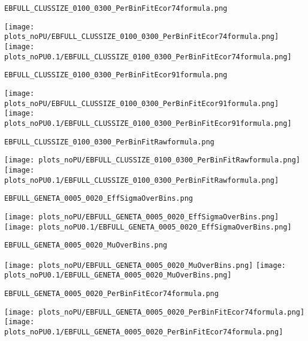 \begin{frame}[fragile]
\begin{verbatim}
EBFULL_CLUSSIZE_0100_0300_PerBinFitEcor74formula.png
\end{verbatim}
\texttt{[image: plots\_noPU/EBFULL\_CLUSSIZE\_0100\_0300\_PerBinFitEcor74formula.png]}
\texttt{[image: plots\_noPU0.1/EBFULL\_CLUSSIZE\_0100\_0300\_PerBinFitEcor74formula.png]}
\end{frame}
\begin{frame}[fragile]
\begin{verbatim}
EBFULL_CLUSSIZE_0100_0300_PerBinFitEcor91formula.png
\end{verbatim}
\texttt{[image: plots\_noPU/EBFULL\_CLUSSIZE\_0100\_0300\_PerBinFitEcor91formula.png]}
\texttt{[image: plots\_noPU0.1/EBFULL\_CLUSSIZE\_0100\_0300\_PerBinFitEcor91formula.png]}
\end{frame}
\begin{frame}[fragile]
\begin{verbatim}
EBFULL_CLUSSIZE_0100_0300_PerBinFitRawformula.png
\end{verbatim}
\texttt{[image: plots\_noPU/EBFULL\_CLUSSIZE\_0100\_0300\_PerBinFitRawformula.png]}
\texttt{[image: plots\_noPU0.1/EBFULL\_CLUSSIZE\_0100\_0300\_PerBinFitRawformula.png]}
\end{frame}
\begin{frame}[fragile]
\begin{verbatim}
EBFULL_GENETA_0005_0020_EffSigmaOverBins.png
\end{verbatim}
\texttt{[image: plots\_noPU/EBFULL\_GENETA\_0005\_0020\_EffSigmaOverBins.png]}
\texttt{[image: plots\_noPU0.1/EBFULL\_GENETA\_0005\_0020\_EffSigmaOverBins.png]}
\end{frame}
\begin{frame}[fragile]
\begin{verbatim}
EBFULL_GENETA_0005_0020_MuOverBins.png
\end{verbatim}
\texttt{[image: plots\_noPU/EBFULL\_GENETA\_0005\_0020\_MuOverBins.png]}
\texttt{[image: plots\_noPU0.1/EBFULL\_GENETA\_0005\_0020\_MuOverBins.png]}
\end{frame}
\begin{frame}[fragile]
\begin{verbatim}
EBFULL_GENETA_0005_0020_PerBinFitEcor74formula.png
\end{verbatim}
\texttt{[image: plots\_noPU/EBFULL\_GENETA\_0005\_0020\_PerBinFitEcor74formula.png]}
\texttt{[image: plots\_noPU0.1/EBFULL\_GENETA\_0005\_0020\_PerBinFitEcor74formula.png]}
\end{frame}
